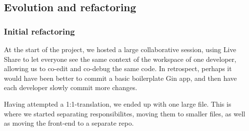 \subsection{Evolution and refactoring}

\subsubsection{Initial refactoring}

At the start of the project, we hosted a large collaborative session, using Live Share \cite{tool:live-share} to let everyone see the same context of the workspace of one developer, allowing us to co-edit and co-debug the same code.
In retrospect, perhaps it would have been better to commit a basic boilerplate Gin app, and then have each developer slowly commit more changes.

Having attempted a 1:1-translation, we ended up with one large file. This is where we started separating responsibilites, moving them to smaller files, as well as moving the front-end to a separate repo.

